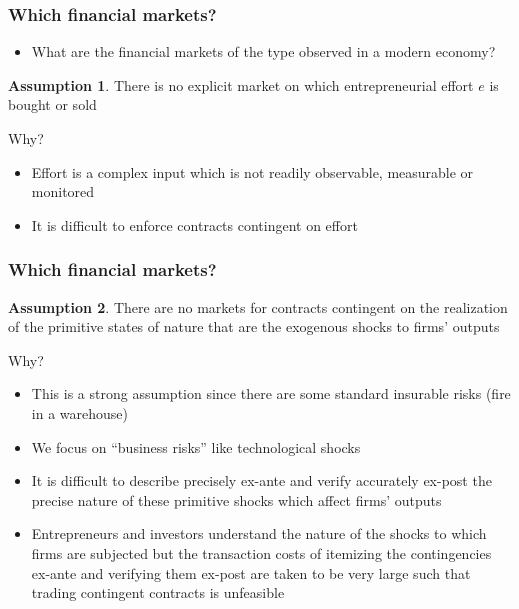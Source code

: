 \documentclass[blue]{beamer}
\theoremstyle{definition}
\newtheorem*{assumption}{Assumption}
\theoremstyle{example}
\begin{document}

\begin{frame}\frametitle{Which financial markets?}


\begin{itemize}
\item What are the financial markets of the type observed in a modern economy?
\end{itemize}

\begin{assumption}
There is no explicit market on which entrepreneurial effort $e$ is bought or sold
\end{assumption}

\begin{block}{Why?}
    \begin{itemize}
    \item Effort is a complex input which is not readily observable, measurable or monitored
    \item It is difficult to enforce contracts contingent on effort
    \end{itemize}
\end{block}


\end{frame}



\begin{frame}\frametitle{Which financial markets?}

\begin{small}
\begin{assumption}
There are no markets for contracts contingent on the realization of the primitive states of nature that are the exogenous shocks to firms' outputs
\end{assumption}

\begin{block}{Why?}
    \begin{itemize}
    \item This is a strong assumption since there are some standard insurable risks (fire in a warehouse)
    \item We focus on ``business risks'' like technological shocks
    \item It is difficult to describe precisely ex-ante and verify accurately ex-post the precise nature of these primitive shocks which affect firms' outputs
    \item Entrepreneurs and investors understand the nature of the shocks to which firms are subjected but the transaction costs of itemizing the contingencies ex-ante and verifying them ex-post are
taken to be very large such that trading contingent contracts is unfeasible
    \end{itemize}
\end{block}
\end{small}

\end{frame}
\end{document}
